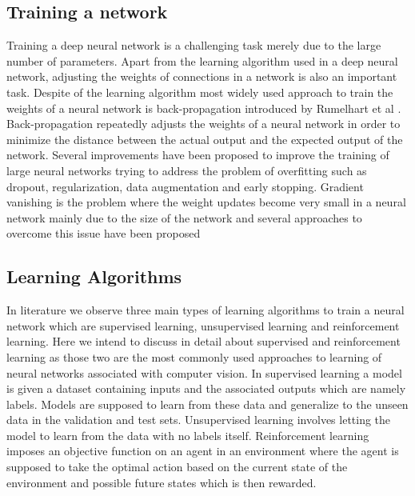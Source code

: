 \subsection{Training a network}
\label{se:rl}

Training a deep neural network is a challenging task merely due to the large number of parameters. Apart from the learning algorithm used in a deep neural network, adjusting the weights of connections in a network is also an important task. Despite of the learning algorithm most widely used approach to train the weights of a neural network is back-propagation introduced by Rumelhart et al \cite{rumelhart1986learning}. Back-propagation repeatedly adjusts the weights of a neural network in order to minimize the distance between the actual output and the expected output of the network. Several improvements have been proposed to improve the training of large neural networks trying to address the problem of overfitting such as dropout\cite{srivastava2014dropout}, regularization\cite{krogh1992simple}, data augmentation and early stopping. Gradient vanishing is the problem where the weight updates become very small in a neural network mainly due to the size of the network and several approaches to overcome this issue have been proposed\cite{hochreiter1997long}\cite{he2016deep}


\subsection{Learning Algorithms}
\label{se:supervisedlearning}

In literature we observe three main types of learning algorithms to train a neural network which are supervised learning, unsupervised learning and reinforcement learning. Here we intend to discuss in detail about supervised and reinforcement learning as those two are the most commonly used approaches to learning of neural networks associated with computer vision. In supervised learning a model is given a dataset containing inputs and the associated outputs which are namely labels. Models are supposed to learn from these data and generalize to the unseen data in the validation and test sets. Unsupervised learning involves letting the model to learn from the data with no labels itself. Reinforcement learning imposes an objective function on an agent in an environment where the agent is supposed to take the optimal action based on the current state of the environment and possible future states which is then rewarded.

